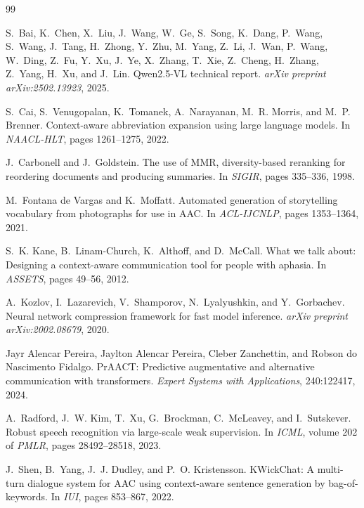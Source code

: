 \begin{thebibliography}{99}

S.~Bai, K.~Chen, X.~Liu, J.~Wang, W.~Ge, S.~Song, K.~Dang, P.~Wang, S.~Wang,
J.~Tang, H.~Zhong, Y.~Zhu, M.~Yang, Z.~Li, J.~Wan, P.~Wang, W.~Ding, Z.~Fu,
Y.~Xu, J.~Ye, X.~Zhang, T.~Xie, Z.~Cheng, H.~Zhang, Z.~Yang, H.~Xu, and
J.~Lin.
\newblock Qwen2.5-VL technical report.
\newblock \emph{arXiv preprint arXiv:2502.13923}, 2025.

S.~Cai, S.~Venugopalan, K.~Tomanek, A.~Narayanan, M.~R. Morris, and M.~P.
Brenner.
\newblock Context-aware abbreviation expansion using large language models.
\newblock In \emph{NAACL-HLT}, pages 1261--1275, 2022.

J.~Carbonell and J.~Goldstein.
\newblock The use of MMR, diversity-based reranking for reordering documents and
producing summaries.
\newblock In \emph{SIGIR}, pages 335--336, 1998.

M.~Fontana de Vargas and K.~Moffatt.
\newblock Automated generation of storytelling vocabulary from photographs for
use in AAC.
\newblock In \emph{ACL-IJCNLP}, pages 1353--1364, 2021.

S.~K. Kane, B.~Linam-Church, K.~Althoff, and D.~McCall.
\newblock What we talk about: Designing a context-aware communication tool for
people with aphasia.
\newblock In \emph{ASSETS}, pages 49--56, 2012.

A.~Kozlov, I.~Lazarevich, V.~Shamporov, N.~Lyalyushkin, and Y.~Gorbachev.
\newblock Neural network compression framework for fast model inference.
\newblock \emph{arXiv preprint arXiv:2002.08679}, 2020.

Jayr Alencar Pereira, Jaylton Alencar Pereira, Cleber Zanchettin, and Robson do Nascimento Fidalgo.
\newblock PrAACT: Predictive augmentative and alternative communication with
transformers.
\newblock \emph{Expert Systems with Applications}, 240:122417, 2024.

A.~Radford, J.~W. Kim, T.~Xu, G.~Brockman, C.~McLeavey, and I.~Sutskever.
\newblock Robust speech recognition via large-scale weak supervision.
\newblock In \emph{ICML}, volume 202 of \emph{PMLR}, pages 28492--28518, 2023.

J.~Shen, B.~Yang, J.~J. Dudley, and P.~O. Kristensson.
\newblock KWickChat: A multi-turn dialogue system for AAC using context-aware
sentence generation by bag-of-keywords.
\newblock In \emph{IUI}, pages 853--867, 2022.


\end{thebibliography}
